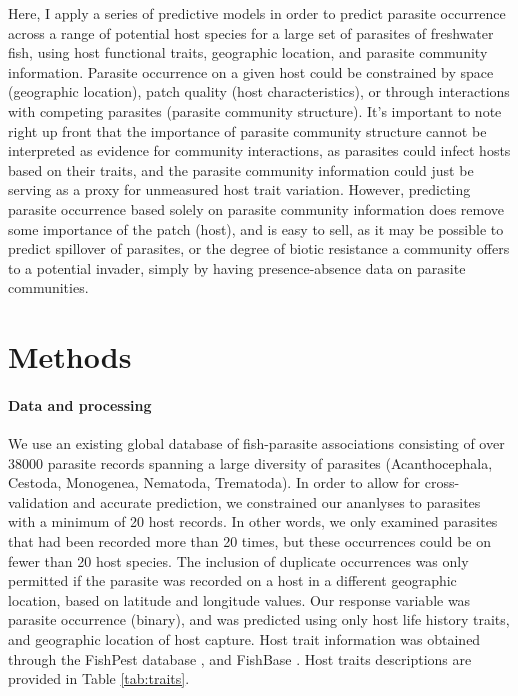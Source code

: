 \documentclass[12pt]{article}
\begin{document}
Here, I apply a series of predictive models in order to predict parasite occurrence across a range of potential host species for a large set of parasites of freshwater fish, using host functional traits, geographic location, and parasite community information. Parasite occurrence on a given host could be constrained by space (geographic location), patch quality (host characteristics), or through interactions with competing parasites (parasite community structure). It's important to note right up front that the importance of parasite community structure cannot be interpreted as evidence for community interactions, as parasites could infect hosts based on their traits, and the parasite community information could just be serving as a proxy for unmeasured host trait variation. However, predicting parasite occurrence based solely on parasite community information does remove some importance of the patch (host), and is easy to sell, as it may be possible to predict spillover of parasites, or the degree of biotic resistance a community offers to a potential invader, simply by having presence-absence data on parasite communities. 





\section{Methods}

 \paragraph{Data and processing}
 We use an existing global database of fish-parasite associations \citep{strona2013} consisting of over 38000 parasite records spanning a large diversity of parasites (Acanthocephala, Cestoda, Monogenea, Nematoda, Trematoda). In order to allow for cross-validation and accurate prediction, we constrained our ananlyses to parasites with a minimum of 20 host records. In other words, we only examined parasites that had been recorded more than 20 times, but these occurrences could be on fewer than 20 host species. The inclusion of duplicate occurrences was only permitted if the parasite was recorded on a host in a different geographic location, based on latitude and longitude values. Our response variable was parasite occurrence (binary), and was predicted using only host life history traits, and geographic location of host capture. Host trait information was obtained through the FishPest database \citep{strona2012, strona2013}, and FishBase \citep{froese2010}. Host traits descriptions are provided in Table \ref{tab:traits}.
 
\end{document}
